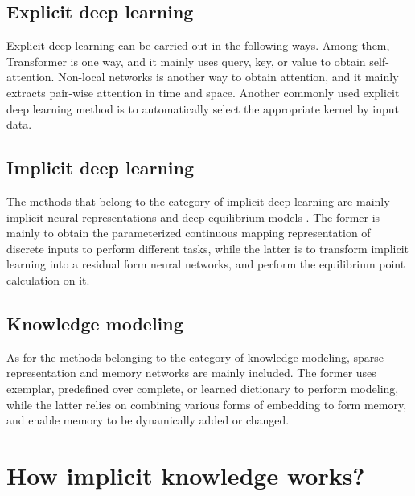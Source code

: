 \documentclass[10pt,twocolumn,letterpaper]{article}
\begin{document}
\subsection{Explicit deep learning}

Explicit deep learning can be carried out in the following ways. Among them, Transformer \cite{vaswani2017attention, carion2020end, wang2021pyramid} is one way, and it mainly uses query, key, or value to obtain self-attention. Non-local networks \cite{wang2018non, cao2019gcnet, yin2020disentangled} is another way to obtain attention, and it mainly extracts pair-wise attention in time and space. Another commonly used explicit deep learning method \cite{li2019selective, zhang2020resnest} is to automatically select the appropriate kernel by input data.

\subsection{Implicit deep learning}

The methods that belong to the category of implicit deep learning are mainly implicit neural representations \cite{sitzmann2020implicit} and deep equilibrium models \cite{bai2019deep, bai2020multiscale, wang2020implicit}. The former is mainly to obtain the parameterized continuous mapping representation of discrete inputs to perform different tasks, while the latter is to transform implicit learning into a residual form neural networks, and perform the equilibrium point calculation on it.

\subsection{Knowledge modeling}

As for the methods belonging to the category of knowledge modeling, sparse representation \cite{aharon2006k, wright2008robust} and memory networks \cite{weston2014memory, sukhbaatar2015end} are mainly included. The former uses exemplar, predefined over complete, or learned dictionary to perform modeling, while the latter relies on combining various forms of embedding to form memory, and enable memory to be dynamically added or changed.

\newpage

\section{How implicit knowledge works?}
\label{sec:how}
\end{document}
